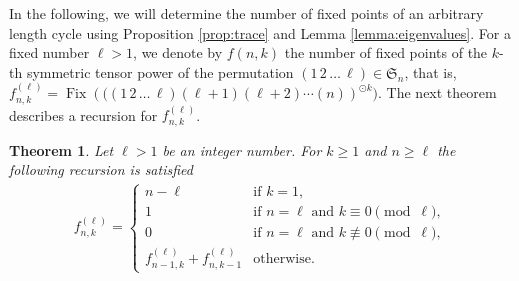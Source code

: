 \documentclass[12pt]{amsart}
\newtheorem{theorem}{Theorem}[section]
\newcommand{\fix}{\operatorname{Fix}}
\begin{document}
    \noindent
    
In the following, we will determine the number of fixed points of an arbitrary length cycle using Proposition \ref{prop:trace} and Lemma \ref{lemma:eigenvalues}. For a fixed number $\ell >1$, we denote by $f(n, k)$ the number of fixed points of the $k$-th symmetric tensor power of the permutation $(1\, 2\, \dots \, \ell) \in \mathfrak{S}_n$, that is, $f ^{(\ell)}_{n,k} = \fix \left (((1\, 2\, \dots \, \ell)(\ell +1)(\ell +2)\cdots (n)\right )^{\odot k})$. The next theorem describes a recursion for $f ^{(\ell)}_{n,k}$.
    
    \begin{theorem}\label{theorem_recursion_fix}
        Let $\ell>1$ be an integer number. For $k \ge 1$ and $n \ge \ell$ the following recursion is satisfied
        \begin{align*}
        f ^{(\ell)}_{n,k} = \begin{cases}
            n - \ell & \text{if }k = 1,\\
            1 & \text{if } n = \ell \text{ and }k \equiv 0 \pmod \ell,\\
            0 & \text{if } n = \ell \text{ and }k \not\equiv 0  \pmod \ell,\\
            f ^{(\ell)}_{n-1,k}+f ^{(\ell)}_{n,k-1} & \text{otherwise.}
        \end{cases}
        \end{align*}
    \end{theorem}
    
\end{document}
